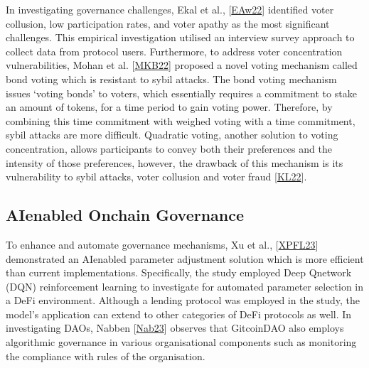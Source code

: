 \documentclass[letterpaper,10pt,english]{jupyterBook}
\begin{document}
\sphinxAtStartPar
In investigating governance challenges, Ekal et al., {[}\hyperlink{cite.GOV/gov:id29}{EAw22}{]} identified voter collusion, low participation rates, and voter apathy as the most significant challenges. This empirical investigation utilised an interview survey approach to collect data from protocol users. Furthermore, to address voter concentration vulnerabilities, Mohan et al. {[}\hyperlink{cite.GOV/gov:id26}{MKB22}{]} proposed a novel voting mechanism called bond voting which is resistant to sybil attacks. The bond voting mechanism issues ‘voting bonds’ to voters, which essentially requires a commitment to stake an amount of tokens, for a time period to gain voting power. Therefore, by combining this time commitment with weighed voting with a time commitment, sybil attacks are more difficult. Quadratic voting, another solution to voting concentration, allows participants to convey both their preferences and the intensity of those preferences, however, the drawback of this mechanism is its vulnerability to sybil attacks, voter collusion and voter fraud {[}\hyperlink{cite.GOV/gov:id36}{KL22}{]}.


\subsection{AI\sphinxhyphen{}enabled On\sphinxhyphen{}chain Governance}
\label{\detokenize{GOV/gov:ai-enabled-on-chain-governance}}
\sphinxAtStartPar
To enhance and automate governance mechanisms, Xu et al., {[}\hyperlink{cite.GOV/gov:id38}{XPFL23}{]} demonstrated an AI\sphinxhyphen{}enabled parameter adjustment solution which is more efficient than current implementations. Specifically, the study employed Deep Q\sphinxhyphen{}network (DQN) reinforcement learning to investigate for automated parameter selection in a DeFi environment. Although a lending protocol was employed in the study, the model’s application can extend to other categories of DeFi protocols as well. In investigating DAOs, Nabben {[}\hyperlink{cite.GOV/gov:id25}{Nab23}{]} observes that GitcoinDAO also employs algorithmic governance in various organisational components such as monitoring the compliance with rules of the organisation.
\end{document}
